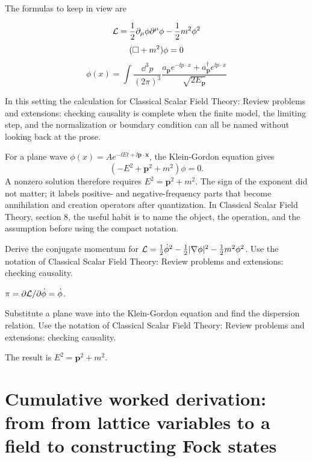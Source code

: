 The formulas to keep in view are

\[
  \mathcal L=\frac12\partial_\mu\phi\partial^\mu\phi-\frac12m^2\phi^2
\]
\[
  (\Box+m^2)\phi=0
\]
\[
  \phi(x)=\int\frac{\dd^3p}{(2\pi)^3}\frac{a_{\bm p}e^{-\ii p\cdot x}+a_{\bm p}^\dagger e^{\ii p\cdot x}}{\sqrt{2E_{\bm p}}}
\]

In this setting the calculation for Classical Scalar Field Theory: Review problems and extensions: checking causality is complete when the finite model, the limiting step, and the normalization or boundary condition can all be named without looking back at the prose.




\begin{example}
For a plane wave \(\phi(x)=Ae^{-\ii Et+\ii\bm p\cdot\bm x}\), the Klein-Gordon equation gives
\[
  (-E^2+\bm p^2+m^2)\phi=0.
\]
A nonzero solution therefore requires \(E^2=\bm p^2+m^2\).  The sign of the exponent did not matter; it labels positive- and negative-frequency parts that become annihilation and creation operators after quantization.  In Classical Scalar Field Theory, section 8, the useful habit is to name the object, the operation, and the assumption before using the compact notation.
\end{example}



\begin{exercise}
Derive the conjugate momentum for \(\mathcal L=\frac12\dot\phi^2-\frac12|\nabla\phi|^2-\frac12m^2\phi^2\).  Use the notation of Classical Scalar Field Theory: Review problems and extensions: checking causality.
\begin{answer}
\(\pi=\partial\mathcal L/\partial\dot\phi=\dot\phi\).
\end{answer}
\end{exercise}

\begin{exercise}
Substitute a plane wave into the Klein-Gordon equation and find the dispersion relation.  Use the notation of Classical Scalar Field Theory: Review problems and extensions: checking causality.
\begin{answer}
The result is \(E^2=\bm p^2+m^2\).
\end{answer}
\end{exercise}



\section{Cumulative worked derivation: from from lattice variables to a field to constructing Fock states}

